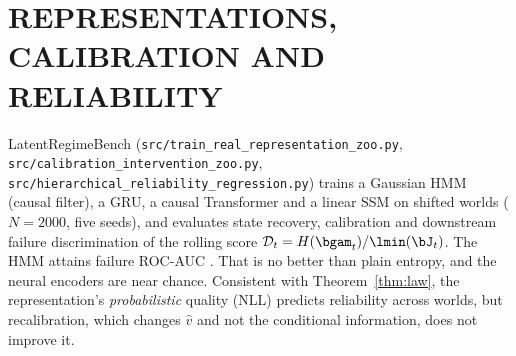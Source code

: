 \section{REPRESENTATIONS, CALIBRATION AND RELIABILITY}
\label{app:zoo}
LatentRegimeBench (\texttt{src/train\_real\_representation\_zoo.py}, \texttt{src/calibration\_intervention\_zoo.py}, \texttt{src/hierarchical\_reliability\_regression.py}) trains a Gaussian HMM (causal filter), a GRU, a causal Transformer and a linear SSM on shifted worlds ($N=2000$, five seeds), and evaluates state recovery, calibration and downstream failure discrimination of the rolling score $\mathcal D_t=H(\bgam_t)/\lmin(\bJ_t)$. The HMM attains failure ROC-AUC \ZooAucHMM. That is no better than plain entropy, and the neural encoders are near chance. Consistent with Theorem~\ref{thm:law}, the representation's \emph{probabilistic} quality (NLL) predicts reliability across worlds, but recalibration, which changes $\hat v$ and not the conditional information, does not improve it.
\begin{table}[h]\centering\footnotesize
\caption{Temperature scaling (\texttt{reports/representation\_zoo\_calibration\_intervention.csv}).}\label{tab:zoocal}

\end{table}
\begin{table}[h]\centering\footnotesize
\caption{Leave-one-world-out prediction of downstream reliability (15 worlds, \texttt{reports/representation\_zoo\_lowo\_evaluation.csv}). With 15 worlds the effective sample is small; we report the comparison, not a significance claim.}\label{tab:lowo}

\end{table}

